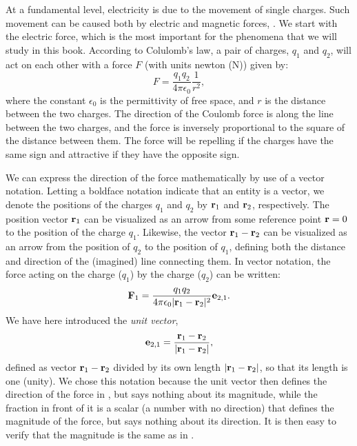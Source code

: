 At a fundamental level, electricity is due to the movement of single charges. Such movement can be caused both by electric and magnetic forces, . 
We  start with the electric force, which is the most important for the phenomena that we will study in this book. According to Colulomb's law, a pair of charges, $q_1$ and $q_2$, will act on each other with a force $F$ (with units newton (\si{\newton})) given by:
\begin{equation}
F = \frac{q_1q_2}{4\pi \epsilon_0} \frac{1}{r^2},
\label{eq:Basics:CoulombF}
\end{equation}
where the constant $\epsilon_0$ is the permittivity of free space, and $r$ is the distance between the two charges. The direction of the Coulomb force is along the line between the two charges, and the force is inversely proportional to the square of the distance between them. The force will be repelling if the charges have the same sign and attractive if they have the opposite sign. 

We can express the direction of the force mathematically by use of a vector notation. Letting a boldface notation indicate that an entity is a vector, we denote the positions of the charges $q_1$ and $q_2$ by ${\bf r}_1$ and ${\bf r}_2$, respectively. The position vector ${\bf r}_1$ can be visualized as an arrow from some reference point ${\bf r} =0$ to the position of the charge $q_1$. Likewise, the vector ${\bf r}_1-{\bf r}_2$ can be visualized as an arrow from the position of $q_2$ to the position of $q_1$, defining both the distance and direction of the (imagined) line connecting them. In vector notation, the force acting on the charge ($q_1$) by the charge ($q_2$) can be written:
\begin{equation}
{\bf F}_{1} = \frac{q_1q_2}{4\pi \epsilon_0 |{\bf r}_1-{\bf r}_2|^2} {{\bf e}}_{2,1}.
\label{eq:Basics:CoulombFvec}
\end{equation}
We have here introduced the \textit{unit vector},
\begin{equation}
{{\bf e}}_{2,1} = \frac{{\bf r}_1 - {\bf r}_2}{|{\bf r}_1-{\bf r}_2|},
\label{eq:Basics:UnitVector}
\end{equation}
defined as vector ${\bf r}_1-{\bf r}_2$ divided by its own length $|{\bf r}_1-{\bf r}_2|$, so that its length is one (unity). We chose this notation because the unit vector then defines the direction of the force in , but says nothing about its magnitude, while the fraction in front of it is a scalar (a number with no direction) that defines the magnitude of the force, but  says nothing about its direction. It is then easy to verify that the magnitude is the same as in .

